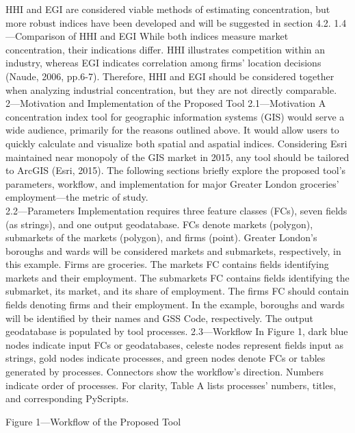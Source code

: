 \documentclass[]{article}
\begin{document}
HHI and EGI are considered viable methods of estimating concentration,
but more robust indices have been developed and will be suggested in
section 4.2. 1.4---Comparison of HHI and EGI While both indices measure
market concentration, their indications differ. HHI illustrates
competition within an industry, whereas EGI indicates correlation among
firms' location decisions (Naude, 2006, pp.6-7). Therefore, HHI and EGI
should be considered together when analyzing industrial concentration,
but they are not directly comparable.\\
2---Motivation and Implementation of the Proposed Tool 2.1---Motivation
A concentration index tool for geographic information systems (GIS)
would serve a wide audience, primarily for the reasons outlined above.
It would allow users to quickly calculate and visualize both spatial and
aspatial indices. Considering Esri maintained near monopoly of the GIS
market in 2015, any tool should be tailored to ArcGIS (Esri, 2015). The
following sections briefly explore the proposed tool's parameters,
workflow, and implementation for major Greater London groceries'
employment---the metric of study.\\
2.2---Parameters Implementation requires three feature classes (FCs),
seven fields (as strings), and one output geodatabase. FCs denote
markets (polygon), submarkets of the markets (polygon), and firms
(point). Greater London's boroughs and wards will be considered markets
and submarkets, respectively, in this example. Firms are groceries. The
markets FC contains fields identifying markets and their employment. The
submarkets FC contains fields identifying the submarket, its market, and
its share of employment. The firms FC should contain fields denoting
firms and their employment. In the example, boroughs and wards will be
identified by their names and GSS Code, respectively. The output
geodatabase is populated by tool processes. 2.3---Workflow In Figure 1,
dark blue nodes indicate input FCs or geodatabases, celeste nodes
represent fields input as strings, gold nodes indicate processes, and
green nodes denote FCs or tables generated by processes. Connectors show
the workflow's direction. Numbers indicate order of processes. For
clarity, Table A lists processes' numbers, titles, and corresponding
PyScripts.

Figure 1---Workflow of the Proposed Tool
\end{document}
